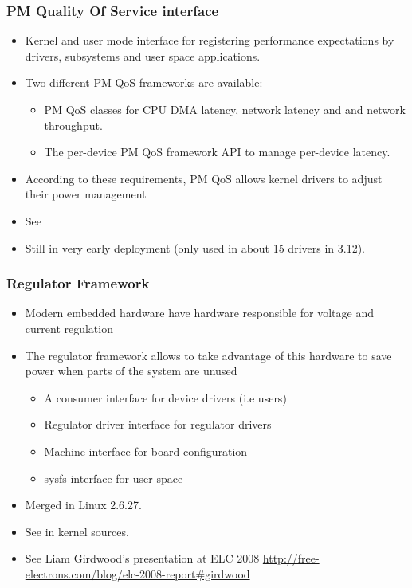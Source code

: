\begin{frame}
  \frametitle{PM Quality Of Service interface}
  \begin{itemize}
  \item Kernel and user mode interface for registering
        performance expectations by drivers, subsystems and user space
        applications.
  \item Two different PM QoS frameworks are available:
    \begin{itemize}
       \item PM QoS classes for CPU DMA latency, network latency and
             and network throughput.
       \item The per-device PM QoS framework API to manage per-device
	     latency.
    \end{itemize}
  \item According to these requirements, PM QoS allows kernel drivers
        to adjust their power management
  \item See 
  \item Still in very early deployment (only used in about 15 drivers in
        3.12).
  \end{itemize}
\end{frame}

\begin{frame}
  \frametitle{Regulator Framework}
  \begin{itemize}
  \item Modern embedded hardware have hardware responsible for voltage
    and current regulation
  \item The regulator framework allows to take advantage of this
    hardware to save power when parts of the system are unused
    \begin{itemize}
    \item A consumer interface for device drivers (i.e users)
    \item Regulator driver interface for regulator drivers
    \item Machine interface for board configuration
    \item sysfs interface for user space
    \end{itemize}
  \item Merged in Linux 2.6.27.
  \item See  in kernel sources.
  \item See Liam Girdwood's presentation at ELC 2008
    \url{http://free-electrons.com/blog/elc-2008-report\#girdwood}
  \end{itemize}
\end{frame}

